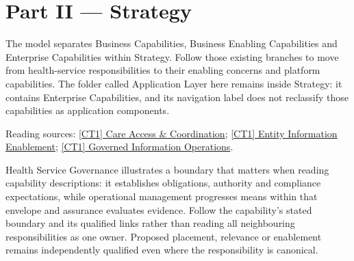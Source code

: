\part*{Part II — Strategy}
\label{navigation:II}
The model separates Business Capabilities, Business Enabling Capabilities and Enterprise Capabilities within Strategy. Follow those existing branches to move from health-service responsibilities to their enabling concerns and platform capabilities. The folder called Application Layer here remains inside Strategy: it contains Enterprise Capabilities, and its navigation label does not reclassify those capabilities as application components.

{\small Reading sources: \hyperref[element:ed342cb8656b4f80b55ad519ecbd2d3a]{[CT1] Care Access \& Coordination}; \hyperref[element:b5a92874f8ac4509a30af5253590edc1]{[CT1] Entity Information Enablement}; \hyperref[element:15e57021490c4e738aee9009ff84a7c3]{[CT1] Governed Information Operations}.}\par
Health Service Governance illustrates a boundary that matters when reading capability descriptions: it establishes obligations, authority and compliance expectations, while operational management progresses means within that envelope and assurance evaluates evidence. Follow the capability's stated boundary and its qualified links rather than reading all neighbouring responsibilities as one owner. Proposed placement, relevance or enablement remains independently qualified even where the responsibility is canonical.

